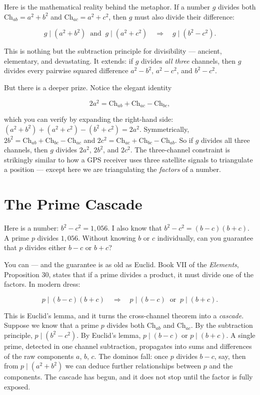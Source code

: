 \documentclass[11pt,twoside,openright]{book}
\theoremstyle{definition}
\theoremstyle{remark}
\begin{document}
Here is the mathematical reality behind the metaphor. If a number $g$ divides both $\mathrm{Ch}_{ab} = a^2 + b^2$ and $\mathrm{Ch}_{ac} = a^2 + c^2$, then $g$ must also divide their difference:

\[g \mid (a^2 + b^2) \;\;\text{and}\;\; g \mid (a^2 + c^2) \quad \Longrightarrow \quad g \mid (b^2 - c^2).\]

This is nothing but the subtraction principle for divisibility --- ancient, elementary, and devastating. It extends: if $g$ divides \textit{all three} channels, then $g$ divides every pairwise squared difference $a^2 - b^2$, $a^2 - c^2$, and $b^2 - c^2$.

But there is a deeper prize. Notice the elegant identity

\[2a^2 = \mathrm{Ch}_{ab} + \mathrm{Ch}_{ac} - \mathrm{Ch}_{bc},\]

which you can verify by expanding the right-hand side: $(a^2 + b^2) + (a^2 + c^2) - (b^2 + c^2) = 2a^2$. Symmetrically, $2b^2 = \mathrm{Ch}_{ab} + \mathrm{Ch}_{bc} - \mathrm{Ch}_{ac}$ and $2c^2 = \mathrm{Ch}_{ac} + \mathrm{Ch}_{bc} - \mathrm{Ch}_{ab}$. So if $g$ divides all three channels, then $g$ divides $2a^2$, $2b^2$, and $2c^2$. The three-channel constraint is strikingly similar to how a GPS receiver uses three satellite signals to triangulate a position --- except here we are triangulating the \textit{factors} of a number.



\section{The Prime Cascade}

Here is a number: $b^2 - c^2 = 1{,}056$. I also know that $b^2 - c^2 = (b - c)(b + c)$. A prime $p$ divides $1{,}056$. Without knowing $b$ or $c$ individually, can you guarantee that $p$ divides either $b - c$ or $b + c$?

You can --- and the guarantee is as old as Euclid. Book VII of the \textit{Elements}, Proposition 30, states that if a prime divides a product, it must divide one of the factors. In modern dress:

\[p \mid (b - c)(b + c) \quad \Longrightarrow \quad p \mid (b - c) \;\;\text{or}\;\; p \mid (b + c).\]

This is Euclid's lemma, and it turns the cross-channel theorem into a \textit{cascade}. Suppose we know that a prime $p$ divides both $\mathrm{Ch}_{ab}$ and $\mathrm{Ch}_{ac}$. By the subtraction principle, $p \mid (b^2 - c^2)$. By Euclid's lemma, $p \mid (b - c)$ or $p \mid (b + c)$. A single prime, detected in one channel subtraction, propagates into sums and differences of the raw components $a$, $b$, $c$. The dominos fall: once $p$ divides $b - c$, say, then from $p \mid (a^2 + b^2)$ we can deduce further relationships between $p$ and the components. The cascade has begun, and it does not stop until the factor is fully exposed.
\end{document}
